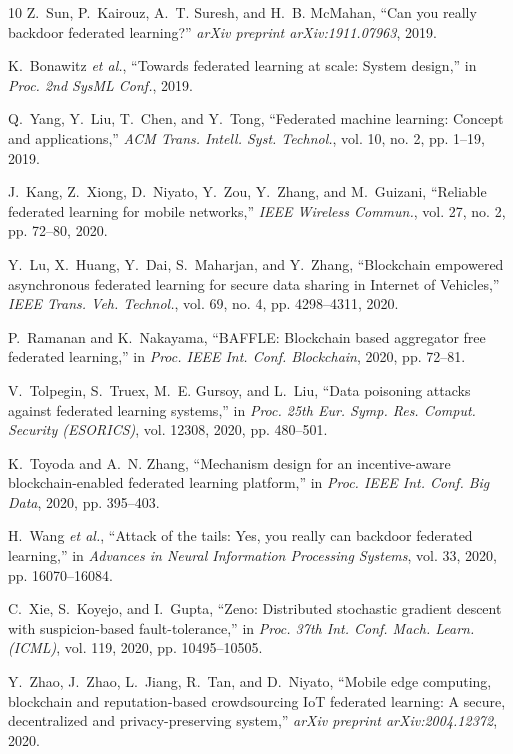 \documentclass[12pt,a4paper,onecolumn]{article}
\begin{document}
\begin{thebibliography}{10}
Z.~Sun, P.~Kairouz, A.~T. Suresh, and H.~B. McMahan,
``Can you really backdoor federated learning?''
\emph{arXiv preprint arXiv:1911.07963}, 2019.

K.~Bonawitz \emph{et al.},
``Towards federated learning at scale: System design,''
in \emph{Proc. 2nd SysML Conf.}, 2019.

Q.~Yang, Y.~Liu, T.~Chen, and Y.~Tong,
``Federated machine learning: Concept and applications,''
\emph{ACM Trans. Intell. Syst. Technol.}, vol. 10, no. 2, pp. 1--19, 2019.

J.~Kang, Z.~Xiong, D.~Niyato, Y.~Zou, Y.~Zhang, and M.~Guizani,
``Reliable federated learning for mobile networks,''
\emph{IEEE Wireless Commun.}, vol. 27, no. 2, pp. 72--80, 2020.

Y.~Lu, X.~Huang, Y.~Dai, S.~Maharjan, and Y.~Zhang,
``Blockchain empowered asynchronous federated learning for secure data sharing in Internet of Vehicles,''
\emph{IEEE Trans. Veh. Technol.}, vol. 69, no. 4, pp. 4298--4311, 2020.

P.~Ramanan and K.~Nakayama,
``BAFFLE: Blockchain based aggregator free federated learning,''
in \emph{Proc. IEEE Int. Conf. Blockchain}, 2020, pp. 72--81.

V.~Tolpegin, S.~Truex, M.~E. Gursoy, and L.~Liu,
``Data poisoning attacks against federated learning systems,''
in \emph{Proc. 25th Eur. Symp. Res. Comput. Security (ESORICS)}, vol. 12308, 2020, pp. 480--501.

K.~Toyoda and A.~N. Zhang,
``Mechanism design for an incentive-aware blockchain-enabled federated learning platform,''
in \emph{Proc. IEEE Int. Conf. Big Data}, 2020, pp. 395--403.

H.~Wang \emph{et al.},
``Attack of the tails: Yes, you really can backdoor federated learning,''
in \emph{Advances in Neural Information Processing Systems}, vol. 33, 2020, pp. 16070--16084.

C.~Xie, S.~Koyejo, and I.~Gupta,
``Zeno: Distributed stochastic gradient descent with suspicion-based fault-tolerance,''
in \emph{Proc. 37th Int. Conf. Mach. Learn. (ICML)}, vol. 119, 2020, pp. 10495--10505.

Y.~Zhao, J.~Zhao, L.~Jiang, R.~Tan, and D.~Niyato,
``Mobile edge computing, blockchain and reputation-based crowdsourcing IoT federated learning: A secure, decentralized and privacy-preserving system,''
\emph{arXiv preprint arXiv:2004.12372}, 2020.


\end{thebibliography}
\end{document}
